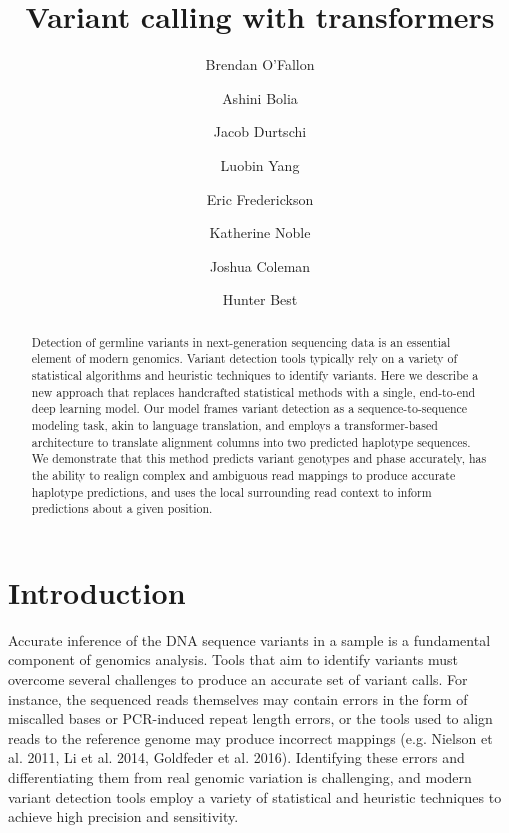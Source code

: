 \documentclass[]{article}
\title{Variant calling with transformers}
\author[1]{Brendan O'Fallon}
\author[1]{Ashini Bolia}
\author[1]{Jacob Durtschi}
\author[1]{Luobin Yang}
\author[1]{Eric Frederickson}
\author[1]{Katherine Noble}
\author[1]{Joshua Coleman}
\author[1]{Hunter Best}
\affil[1]{ARUP Institute for Clinical and Experimental Pathology, Salt Lake City, UT}
\date{}
\begin{document}
\maketitle

\begin{abstract}
	Detection of germline variants in next-generation sequencing data is an essential element of modern genomics. Variant detection tools typically rely on a variety of statistical algorithms and heuristic techniques to identify variants. Here we describe a new approach that replaces handcrafted statistical methods with a single, end-to-end deep learning model. Our model frames variant detection as a sequence-to-sequence modeling task, akin to language translation, and employs a transformer-based architecture to translate alignment columns into two predicted haplotype sequences. We demonstrate that this method predicts variant genotypes and phase accurately, has the ability to realign complex and ambiguous read mappings to produce accurate haplotype predictions, and uses the local surrounding read context to inform predictions about a given position. 

\end{abstract}



\section{Introduction}

Accurate inference of the DNA sequence variants in a sample is a fundamental component of genomics analysis. Tools that aim to identify variants must overcome several challenges to produce an accurate set of variant calls. For instance, the sequenced reads themselves may contain errors in the form of miscalled bases or PCR-induced repeat length errors, or the tools used to align reads to the reference genome may produce incorrect mappings (e.g. Nielson et al. 2011, Li et al. 2014, Goldfeder et al. 2016). Identifying these errors and differentiating them from real genomic variation is challenging, and modern variant detection tools employ a variety of statistical and heuristic techniques to achieve high precision and sensitivity. 
\end{document}
